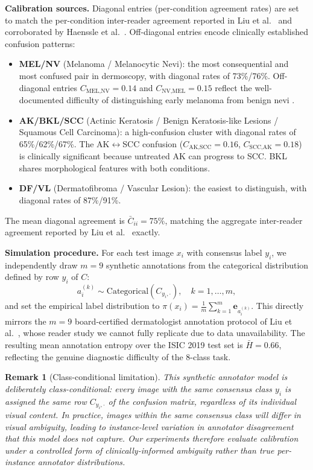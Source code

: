 \documentclass[10pt,journal,compsoc]{IEEEtran}
\newtheorem{remark}{Remark}
\begin{document}
\noindent\textbf{Calibration sources.}
Diagonal entries (per-condition agreement rates) are set to match the per-condition
inter-reader agreement reported in Liu et al.~\cite{liu2020deep} and corroborated by
Haenssle et al.~\cite{haenssle2018man}.  Off-diagonal entries encode clinically established
confusion patterns:
\begin{itemize}[noitemsep, topsep=2pt]
  \item \textbf{MEL/NV} (Melanoma / Melanocytic Nevi): the most consequential and
        most confused pair in dermoscopy, with diagonal rates of 73\%/76\%.
        Off-diagonal entries $C_{\text{MEL},\text{NV}}=0.14$ and
        $C_{\text{NV},\text{MEL}}=0.15$ reflect the well-documented difficulty of
        distinguishing early melanoma from benign nevi \cite{haenssle2018man}.
  \item \textbf{AK/BKL/SCC} (Actinic Keratosis / Benign Keratosis-like Lesions /
        Squamous Cell Carcinoma): a high-confusion cluster with diagonal rates of
        65\%/62\%/67\%.  The AK$\leftrightarrow$SCC confusion ($C_{\text{AK},\text{SCC}}=0.16$,
        $C_{\text{SCC},\text{AK}}=0.18$) is clinically significant because
        untreated AK can progress to SCC.  BKL shares morphological features
        with both conditions.
  \item \textbf{DF/VL} (Dermatofibroma / Vascular Lesion): the easiest to
        distinguish, with diagonal rates of 87\%/91\%.
\end{itemize}
The mean diagonal agreement is
$\bar{C}_{ii} = 75\%$, matching the aggregate inter-reader agreement reported
by Liu et al.~\cite{liu2020deep} exactly.

\noindent\textbf{Simulation procedure.}
For each test image $x_i$ with consensus label $y_i$, we independently draw $m=9$
synthetic annotations from the categorical distribution defined by row $y_i$ of
$C$:
\[
  a^{(k)}_i \sim \mathrm{Categorical}\!\left(C_{y_i,\cdot}\right),
  \quad k = 1,\ldots,m,
\]
and set the empirical label distribution to
$\pi(x_i) = \frac{1}{m}\sum_{k=1}^m \mathbf{e}_{a^{(k)}_i}$.
This directly mirrors the $m=9$ board-certified dermatologist annotation protocol of
Liu et al.~\cite{liu2020deep}, whose reader study we cannot fully replicate due to data
unavailability.  The resulting mean annotation entropy over the ISIC 2019 test set
is $\bar{H}=0.66$, reflecting the genuine diagnostic difficulty of the 8-class task.

\begin{remark}[Class-conditional limitation]
This synthetic annotator model is deliberately class-conditional: every image with the same consensus class $y_i$ is assigned the same row $C_{y_i,\cdot}$ of the confusion matrix, regardless of its individual visual content.  In practice, images within the same consensus class will differ in visual ambiguity, leading to instance-level variation in annotator disagreement that this model does not capture.  Our experiments therefore evaluate calibration under a controlled form of clinically-informed ambiguity rather than true per-instance annotator distributions.
\end{remark}
\end{document}
